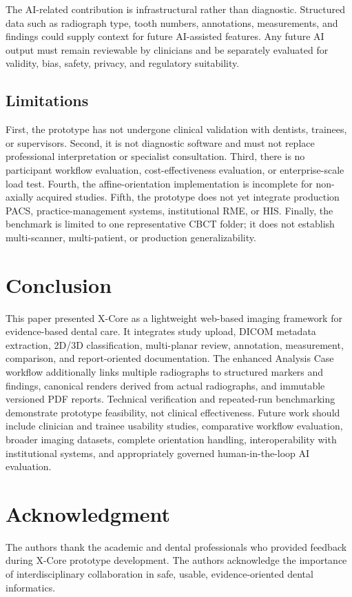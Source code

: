 \documentclass[journal]{IEEEtran}
\begin{document}
The AI-related contribution is infrastructural rather than diagnostic. Structured data such as radiograph type, tooth numbers, annotations, measurements, and findings could supply context for future AI-assisted features. Any future AI output must remain reviewable by clinicians and be separately evaluated for validity, bias, safety, privacy, and regulatory suitability.

\subsection{Limitations}

First, the prototype has not undergone clinical validation with dentists, trainees, or supervisors. Second, it is not diagnostic software and must not replace professional interpretation or specialist consultation. Third, there is no participant workflow evaluation, cost-effectiveness evaluation, or enterprise-scale load test. Fourth, the affine-orientation implementation is incomplete for non-axially acquired studies. Fifth, the prototype does not yet integrate production PACS, practice-management systems, institutional RME, or HIS. Finally, the benchmark is limited to one representative CBCT folder; it does not establish multi-scanner, multi-patient, or production generalizability.

\section{Conclusion}
\label{sec:conclusion}

This paper presented X-Core as a lightweight web-based imaging framework for evidence-based dental care. It integrates study upload, DICOM metadata extraction, 2D/3D classification, multi-planar review, annotation, measurement, comparison, and report-oriented documentation. The enhanced Analysis Case workflow additionally links multiple radiographs to structured markers and findings, canonical renders derived from actual radiographs, and immutable versioned PDF reports. Technical verification and repeated-run benchmarking demonstrate prototype feasibility, not clinical effectiveness. Future work should include clinician and trainee usability studies, comparative workflow evaluation, broader imaging datasets, complete orientation handling, interoperability with institutional systems, and appropriately governed human-in-the-loop AI evaluation.

\section*{Acknowledgment}
The authors thank the academic and dental professionals who provided feedback during X-Core prototype development. The authors acknowledge the importance of interdisciplinary collaboration in safe, usable, evidence-oriented dental informatics.
\end{document}
